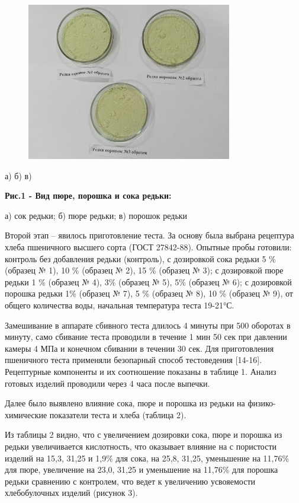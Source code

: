 \begin{figure}[H]
	\centering
	\includegraphics[width=0.8\textwidth]{media/pish/image60}
	\caption*{}
\end{figure}


а) б) в)

{\bfseries Рис.1 - Вид пюре, порошка и сока редьки:}

а) сок редьки; б) пюре редьки; в) порошок редьки

Второй этап -- явилось приготовление теста. За основу была выбрана
рецептура хлеба пшеничного высшего сорта (ГОСТ 27842-88). Опытные пробы
готовили: контроль без добавления редьки (контроль), с дозировкой сока
редьки 5 \% (образец № 1), 10 \% (образец № 2), 15 \% (образец № 3); с
дозировкой пюре редьки 1 \% (образец № 4), 3\% (образец № 5), 5\%
(образец № 6); с дозировкой порошка редьки 1\% (образец № 7), 5 \%
(образец № 8), 10 \% (образец № 9), от общего количества воды, начальная
температура теста 19-21°С.

Замешивание в аппарате сбивного теста длилось 4 минуты при 500 оборотах
в минуту, само сбивание теста проводили в течение 1 мин 50 сек при
давлении камеры 4 МПа и конечном сбивании в течении 30 сек. Для
приготовления пшеничного теста применяли безопарный способ тестоведения
{[}14-16{]}. Рецептурные компоненты и их соотношение показаны в таблице
1. Анализ готовых изделий проводили через 4 часа после выпечки.

Далее было выявлено влияние сока, пюре и порошка из редьки на
физико-химические показатели теста и хлеба (таблица 2).

Из таблицы 2 видно, что с увеличением дозировки сока, пюре и порошка из
редьки увеличивается кислотность, что оказывает влияние на с пористости
изделий на 15,3, 31,25 и 1,9\% для сока, на 25,8, 31,25, уменьшение на
11,76\% для пюре, увеличение на 23,0, 31,25 и уменьшение на 11,76\% для
порошка редьки сравнению с контролем, что ведет к увеличению усвояемости
хлебобулочных изделий (рисунок 3).

